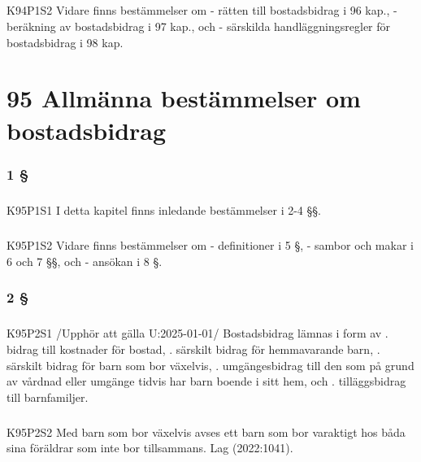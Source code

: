 \documentclass[a4paper,notitlepage,openany,10pt]{book}
\begin{document}
\paragraph*{}
{\tiny K94P1S2}
Vidare finns bestämmelser om
\newline - rätten till bostadsbidrag i 96 kap.,
\newline - beräkning av bostadsbidrag i 97 kap., och
\newline - särskilda handläggningsregler för bostadsbidrag i 98 kap.
\chapter*{95 Allmänna bestämmelser om bostadsbidrag}
\subsection*{1 §}
\paragraph*{}
{\tiny K95P1S1}
I detta kapitel finns inledande bestämmelser i 2-4 §§.
\paragraph*{}
{\tiny K95P1S2}
Vidare finns bestämmelser om
\newline - definitioner i 5 §,
\newline - sambor och makar i 6 och 7 §§, och
\newline - ansökan i 8 §.
\subsection*{2 §}
\paragraph*{}
{\tiny K95P2S1}
/Upphör att gälla U:2025-01-01/
Bostadsbidrag lämnas i form av
. bidrag till kostnader för bostad,
. särskilt bidrag för hemmavarande barn,
. särskilt bidrag för barn som bor växelvis,
. umgängesbidrag till den som på grund av vårdnad eller umgänge tidvis har barn boende i sitt hem, och
. tilläggsbidrag till barnfamiljer.
\paragraph*{}
{\tiny K95P2S2}
Med barn som bor växelvis avses ett barn som bor varaktigt hos båda sina föräldrar som inte bor tillsammans.
Lag (2022:1041).
\end{document}
